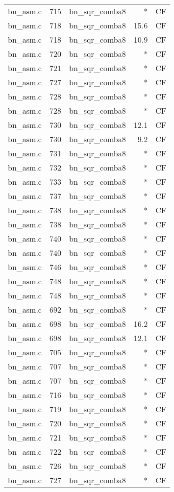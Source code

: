 \begin{table}[h!]
\begin{tabular}{lrlrr}
bn\_asm.c& 715&bn\_sqr\_comba8&*&CF\\
bn\_asm.c& 718&bn\_sqr\_comba8&15.6 &CF\\
bn\_asm.c& 718&bn\_sqr\_comba8&10.9 &CF\\
bn\_asm.c& 720&bn\_sqr\_comba8&*&CF\\
bn\_asm.c& 721&bn\_sqr\_comba8&*&CF\\
bn\_asm.c& 727&bn\_sqr\_comba8&*&CF\\
bn\_asm.c& 728&bn\_sqr\_comba8&*&CF\\
bn\_asm.c& 728&bn\_sqr\_comba8&*&CF\\
bn\_asm.c& 730&bn\_sqr\_comba8&12.1 &CF\\
bn\_asm.c& 730&bn\_sqr\_comba8&9.2 &CF\\
bn\_asm.c& 731&bn\_sqr\_comba8&*&CF\\
bn\_asm.c& 732&bn\_sqr\_comba8&*&CF\\
bn\_asm.c& 733&bn\_sqr\_comba8&*&CF\\
bn\_asm.c& 737&bn\_sqr\_comba8&*&CF\\
bn\_asm.c& 738&bn\_sqr\_comba8&*&CF\\
bn\_asm.c& 738&bn\_sqr\_comba8&*&CF\\
bn\_asm.c& 740&bn\_sqr\_comba8&*&CF\\
bn\_asm.c& 740&bn\_sqr\_comba8&*&CF\\
bn\_asm.c& 746&bn\_sqr\_comba8&*&CF\\
bn\_asm.c& 748&bn\_sqr\_comba8&*&CF\\
bn\_asm.c& 748&bn\_sqr\_comba8&*&CF\\
bn\_asm.c& 692&bn\_sqr\_comba8&*&CF\\
bn\_asm.c& 698&bn\_sqr\_comba8&16.2 &CF\\
bn\_asm.c& 698&bn\_sqr\_comba8&12.1 &CF\\
bn\_asm.c& 705&bn\_sqr\_comba8&*&CF\\
bn\_asm.c& 707&bn\_sqr\_comba8&*&CF\\
bn\_asm.c& 707&bn\_sqr\_comba8&*&CF\\
bn\_asm.c& 716&bn\_sqr\_comba8&*&CF\\
bn\_asm.c& 719&bn\_sqr\_comba8&*&CF\\
bn\_asm.c& 720&bn\_sqr\_comba8&*&CF\\
bn\_asm.c& 721&bn\_sqr\_comba8&*&CF\\
bn\_asm.c& 722&bn\_sqr\_comba8&*&CF\\
bn\_asm.c& 726&bn\_sqr\_comba8&*&CF\\
bn\_asm.c& 727&bn\_sqr\_comba8&*&CF\\

\end{tabular}
\end{table}
